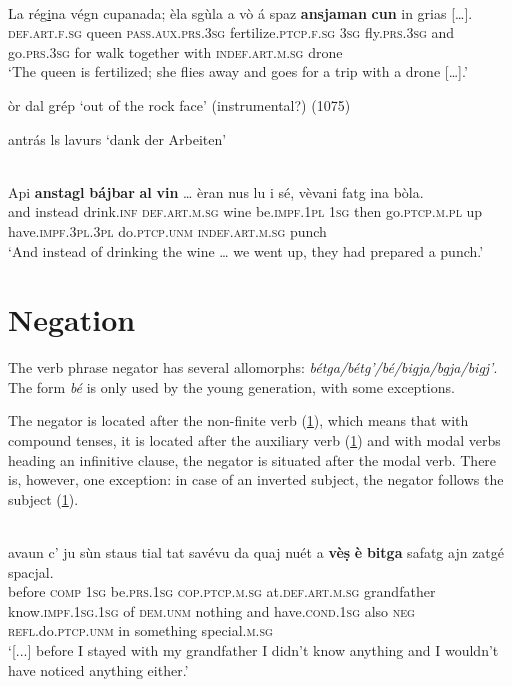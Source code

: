 \ea
\label{}
\\
\gll   La rég\underline{i}na végn cupanada; èla sgùla a vò á spaz \textbf{ansjaman} \textbf{cun} in grias […]. \\
    \textsc{def.art.f.sg} queen  \textsc{pass.aux.prs.3sg} fertilize.\textsc{ptcp.f.sg} \textsc{3sg} fly.\textsc{prs.3sg} and go.\textsc{prs.3sg} for walk together with \textsc{indef.art.m.sg} drone \\
\glt `The queen is fertilized; she flies away and goes for a trip with a drone […].'
\z


òr dal grép `out of the rock face' (instrumental?) (1075)

antrás ls lavurs `dank der Arbeiten' 

\ea
\label{}
\\
	\gll    Api \textbf{anstagl} \textbf{bájbar} \textbf{al} \textbf{vin} … èran nus lu i sé, vèvani fatg ina bòla.\\
and instead drink.\textsc{inf} \textsc{def.art.m.sg} wine {} be.\textsc{impf.1pl} \textsc{1sg} then go.\textsc{ptcp.m.pl} up have.\textsc{impf.3pl.3pl} do.\textsc{ptcp.unm} \textsc{indef.art.m.sg} punch \\
\glt `And instead of drinking the wine … we went up, they had prepared a punch.'
\z

\section{Negation}
The verb phrase negator has several allomorphs:  \textit{bétga/bétg'/bé/bigja/bgja/bigj'}. The form \textit{bé} is only used by the young generation, with some exceptions.

The negator is located after the non-finite verb (\ref{}), which means that with compound tenses, it is located after the auxiliary verb (\ref{}) and with modal verbs heading an infinitive clause, the negator is situated after the modal verb. There is, however, one exception: in case of an inverted subject, the negator follows the subject (\ref{}).

\ea
\label{}
\\
\gll  [...] avaun c’ ju sùn staus tial tat savévu da quaj nuét a \textbf{vèṣ} \textbf{è} \textbf{bitga} safatg ajn zatgé spacjal.  \\
{} before \textsc{comp} \textsc{1sg} be.\textsc{prs.1sg} \textsc{cop.ptcp.m.sg} at.\textsc{def.art.m.sg} grandfather know.\textsc{impf.1sg.1sg} of \textsc{dem.unm} nothing and have.\textsc{cond.1sg} also \textsc{neg} \textsc{refl.}do.\textsc{ptcp.unm} in something special.\textsc{m.sg}\\
\glt `[...] before I stayed with my grandfather I didn’t know anything and I wouldn’t have noticed anything either.'
\z

